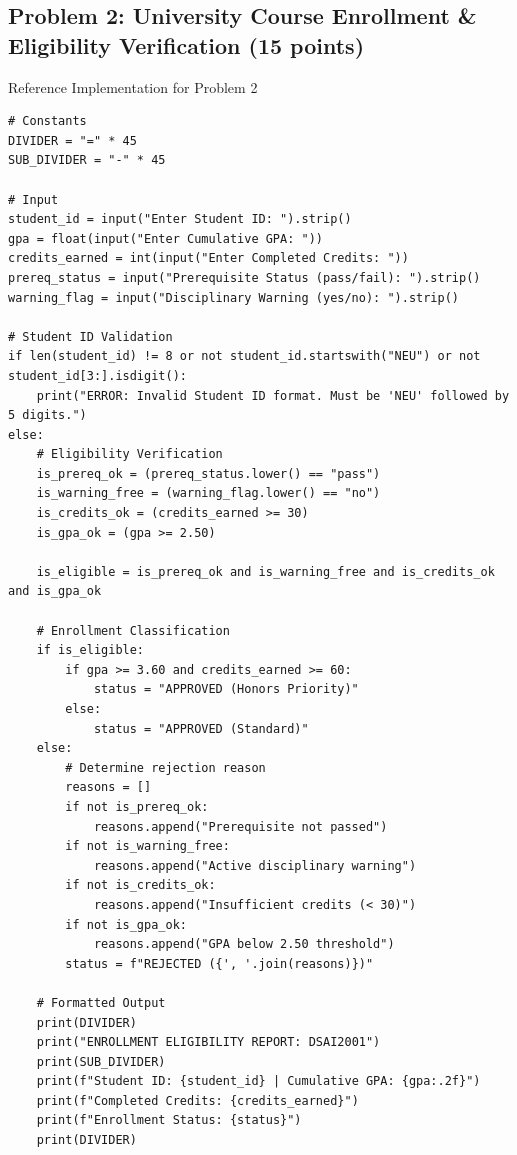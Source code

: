 \documentclass[11pt,a4paper]{article}
\begin{document}
\subsection*{Problem 2: University Course Enrollment \& Eligibility Verification (15 points)}
\begin{solbox}{Reference Implementation for Problem 2}
\begin{lstlisting}
# Constants
DIVIDER = "=" * 45
SUB_DIVIDER = "-" * 45

# Input
student_id = input("Enter Student ID: ").strip()
gpa = float(input("Enter Cumulative GPA: "))
credits_earned = int(input("Enter Completed Credits: "))
prereq_status = input("Prerequisite Status (pass/fail): ").strip()
warning_flag = input("Disciplinary Warning (yes/no): ").strip()

# Student ID Validation
if len(student_id) != 8 or not student_id.startswith("NEU") or not student_id[3:].isdigit():
    print("ERROR: Invalid Student ID format. Must be 'NEU' followed by 5 digits.")
else:
    # Eligibility Verification
    is_prereq_ok = (prereq_status.lower() == "pass")
    is_warning_free = (warning_flag.lower() == "no")
    is_credits_ok = (credits_earned >= 30)
    is_gpa_ok = (gpa >= 2.50)

    is_eligible = is_prereq_ok and is_warning_free and is_credits_ok and is_gpa_ok

    # Enrollment Classification
    if is_eligible:
        if gpa >= 3.60 and credits_earned >= 60:
            status = "APPROVED (Honors Priority)"
        else:
            status = "APPROVED (Standard)"
    else:
        # Determine rejection reason
        reasons = []
        if not is_prereq_ok:
            reasons.append("Prerequisite not passed")
        if not is_warning_free:
            reasons.append("Active disciplinary warning")
        if not is_credits_ok:
            reasons.append("Insufficient credits (< 30)")
        if not is_gpa_ok:
            reasons.append("GPA below 2.50 threshold")
        status = f"REJECTED ({', '.join(reasons)})"

    # Formatted Output
    print(DIVIDER)
    print("ENROLLMENT ELIGIBILITY REPORT: DSAI2001")
    print(SUB_DIVIDER)
    print(f"Student ID: {student_id} | Cumulative GPA: {gpa:.2f}")
    print(f"Completed Credits: {credits_earned}")
    print(f"Enrollment Status: {status}")
    print(DIVIDER)
\end{lstlisting}
\end{solbox}
\end{document}
